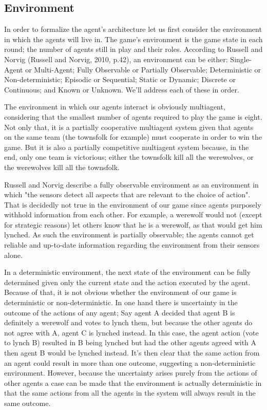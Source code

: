 \documentclass{article}
\begin{document}
\subsection{Environment}
In order to formalize the agent's architecture let us first consider the environment in which the agents will live in. The game's environment is the game state in each round; the number of agents still in play and their roles. According to Russell and Norvig (Russell and Norvig, 2010, p.42), an environment can be either: Single-Agent or Multi-Agent; Fully Observable or Partially Observable; Deterministic or Non-deterministic; Episodic or Sequential; Static or Dynamic; Discrete or Continuous; and Known or Unknown. We'll address each of these in order.

The environment in which our agents interact is obviously multiagent, considering that the smallest number of agents required to play the game is eight. Not only that, it is a partially cooperative multiagent system given that agents on the same team (the townsfolk for example) must cooperate in order to win the game. But it is also a partially competitive multiagent system because, in the end, only one team is victorious; either the townsfolk kill all the werewolves, or the werewolves kill all the townsfolk.

Russell and Norvig describe a fully observable environment as an environment in which "the sensors detect all aspects that are relevant to the choice of action". That is decidedly not true in the environment of our game since agents purposely withhold information from each other. For example, a werewolf would not (except for strategic reasons) let others know that he is a werewolf, as that would get him lynched. As such the environment is partially observable; the agents cannot get reliable and up-to-date information regarding the environment from their sensors alone.

In a deterministic environment, the next state of the environment can be fully determined given only the current state and the action executed by the agent. Because of that, it is not obvious whether the environment of our game is deterministic or non-deterministic. In one hand there is uncertainty in the outcome of the actions of any agent; Say agent A decided that agent B is definitely a werewolf and votes to lynch them, but because the other agents do not agree with A, agent C is lynched instead. In this case, the agent action (vote to lynch B) resulted in B being lynched but had the other agents agreed with A then agent B would be lynched instead. It's then clear that the same action from an agent could result in more than one outcome, suggesting a non-deterministic environment. However, because the uncertainty arises purely from the actions of other agents a case can be made that the environment is actually deterministic in that the same actions from all the agents in the system will always result in the same outcome.
\end{document}
